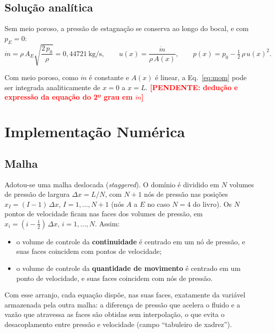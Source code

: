 \documentclass[11pt,a4paper]{article}
\newcommand{\pendente}[1]{\textcolor{red}{\textbf{[PENDENTE: #1]}}}
\begin{document}
\subsection{Solução analítica}

Sem meio poroso, a pressão de estagnação se conserva ao longo do bocal, e
com $p_E=0$:
\begin{equation}
  \dot m=\rho\,A_E\sqrt{\frac{2\,p_0}{\rho}}=0{,}44721~\mathrm{kg/s},
  \qquad
  u(x)=\frac{\dot m}{\rho\,A(x)},
  \qquad
  p(x)=p_0-\tfrac12\,\rho\,u(x)^2 .
  \label{eq:exata}
\end{equation}

Com meio poroso, como $\dot m$ é constante e $A(x)$ é linear, a
Eq.~\eqref{eq:mom} pode ser integrada analiticamente de $x=0$ a $x=L$.
\pendente{dedução e expressão da equação do 2º grau em $\dot m$}

\section{Implementação Numérica}

\subsection{Malha}

Adotou-se uma malha deslocada (\emph{staggered}). O domínio é dividido em
$N$ volumes de pressão de largura $\Delta x=L/N$, com $N+1$ nós de pressão
nas posições $x_I=(I-1)\,\Delta x$, $I=1,\dots,N+1$ (nós $A$ a $E$ no caso
$N=4$ do livro). Os $N$ pontos de velocidade ficam nas faces dos volumes de
pressão, em $x_i=(i-\tfrac12)\,\Delta x$, $i=1,\dots,N$. Assim:
\begin{itemize}
  \item o volume de controle da \textbf{continuidade} é centrado em um nó
        de pressão, e suas faces coincidem com pontos de velocidade;
  \item o volume de controle da \textbf{quantidade de movimento} é centrado
        em um ponto de velocidade, e suas faces coincidem com nós de pressão.
\end{itemize}
Com esse arranjo, cada equação dispõe, nas suas faces, exatamente da
variável armazenada pela outra malha: a diferença de pressão que acelera o
fluido e a vazão que atravessa as faces são obtidas sem interpolação, o que
evita o desacoplamento entre pressão e velocidade (campo ``tabuleiro de
xadrez'').
\end{document}
